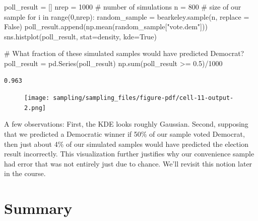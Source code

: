 \documentclass[
  letterpaper,
  DIV=11,
  numbers=noendperiod]{scrreprt}
\newenvironment{Shaded}{\begin{snugshade}}{\end{snugshade}}
\newcommand{\BuiltInTok}[1]{\textcolor[rgb]{0.00,0.23,0.31}{#1}}
\newcommand{\CommentTok}[1]{\textcolor[rgb]{0.37,0.37,0.37}{#1}}
\newcommand{\ControlFlowTok}[1]{\textcolor[rgb]{0.00,0.23,0.31}{#1}}
\newcommand{\DecValTok}[1]{\textcolor[rgb]{0.68,0.00,0.00}{#1}}
\newcommand{\FloatTok}[1]{\textcolor[rgb]{0.68,0.00,0.00}{#1}}
\newcommand{\KeywordTok}[1]{\textcolor[rgb]{0.00,0.23,0.31}{#1}}
\newcommand{\NormalTok}[1]{\textcolor[rgb]{0.00,0.23,0.31}{#1}}
\newcommand{\OperatorTok}[1]{\textcolor[rgb]{0.37,0.37,0.37}{#1}}
\newcommand{\StringTok}[1]{\textcolor[rgb]{0.13,0.47,0.30}{#1}}
\newcommand{\VariableTok}[1]{\textcolor[rgb]{0.07,0.07,0.07}{#1}}
\begin{document}
\begin{Shaded}
\begin{Highlighting}[]
\NormalTok{poll\_result }\OperatorTok{=}\NormalTok{ []}
\NormalTok{nrep }\OperatorTok{=} \DecValTok{1000}   \CommentTok{\# number of simulations}
\NormalTok{n }\OperatorTok{=} \DecValTok{800}       \CommentTok{\# size of our sample}
\ControlFlowTok{for}\NormalTok{ i }\KeywordTok{in} \BuiltInTok{range}\NormalTok{(}\DecValTok{0}\NormalTok{,nrep):}
\NormalTok{    random\_sample }\OperatorTok{=}\NormalTok{ bearkeley.sample(n, replace }\OperatorTok{=} \VariableTok{False}\NormalTok{)}
\NormalTok{    poll\_result.append(np.mean(random\_sample[}\StringTok{"vote.dem"}\NormalTok{]))}
\NormalTok{sns.histplot(poll\_result, stat}\OperatorTok{=}\StringTok{\textquotesingle{}density\textquotesingle{}}\NormalTok{, kde}\OperatorTok{=}\VariableTok{True}\NormalTok{)}

\CommentTok{\# What fraction of these simulated samples would have predicted Democrat?}
\NormalTok{poll\_result }\OperatorTok{=}\NormalTok{ pd.Series(poll\_result)}
\NormalTok{np.}\BuiltInTok{sum}\NormalTok{(poll\_result }\OperatorTok{\textgreater{}=} \FloatTok{0.5}\NormalTok{)}\OperatorTok{/}\DecValTok{1000}
\end{Highlighting}
\end{Shaded}

\begin{verbatim}
0.963
\end{verbatim}

\begin{figure}[H]

{\centering \texttt{[image: sampling/sampling\_files/figure-pdf/cell-11-output-2.png]}

}

\end{figure}

A few observations: First, the KDE looks roughly Gaussian. Second,
supposing that we predicted a Democratic winner if 50\% of our sample
voted Democrat, then just about 4\% of our simulated samples would have
predicted the election result incorrectly. This visualization further
justifies why our convenience sample had error that was not entirely
just due to chance. We'll revisit this notion later in the course.

\hypertarget{summary}{%
\section{Summary}\label{summary}}
\end{document}
